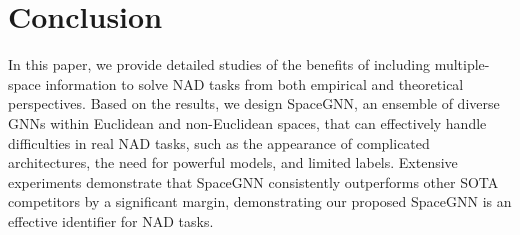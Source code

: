 \section{Conclusion}
\label{sec:conclusion}

In this paper, we provide detailed studies of the benefits of including multiple-space information to solve NAD tasks from both empirical and theoretical perspectives. Based on the results, we design SpaceGNN, an ensemble of diverse GNNs within Euclidean and non-Euclidean spaces, that can effectively handle difficulties in real NAD tasks, such as the appearance of complicated architectures, the need for powerful models, and limited labels. Extensive experiments demonstrate that SpaceGNN consistently outperforms other SOTA competitors by a significant margin, demonstrating our proposed SpaceGNN is an effective identifier for NAD tasks. 
